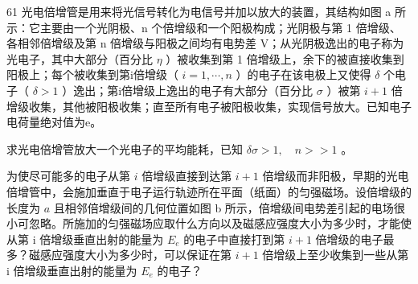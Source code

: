 \begin{problem}[33届物理竞赛复赛]{61}
    光电倍增管是用来将光信号转化为电信号并加以放大的装置，其结构如图 a 所示：它主要由一个光阴极、n 个倍增级和一个阳极构成；光阴极与第 1 倍增级、各相邻倍增级及第 n 倍增级与阳极之间均有电势差 V；从光阴极逸出的电子称为光电子，其中大部分（百分比 $\eta$ ）被收集到第 1 倍增级上，余下的被直接收集到阳极上；每个被收集到第i倍增级（ $i=1,\cdots,n$ ）的电子在该电极上又使得 $\delta$ 个电子（ $\delta>1$ ）逸出；第i倍增级上逸出的电子有大部分（百分比 $\sigma$ ）被第 $i+1$ 倍增级收集，其他被阳极收集；直至所有电子被阳极收集，实现信号放大。已知电子电荷量绝对值为e。

    \begin{subproblem}
        求光电倍增管放大一个光电子的平均能耗，已知 $\delta\sigma>1,\quad n>>1$ 。
    \end{subproblem}
    \begin{subproblem}
        为使尽可能多的电子从第 $i$ 倍增级直接到达第 $i + 1$ 倍增级而非阳极，早期的光电倍增管中，会施加垂直于电子运行轨迹所在平面（纸面）的匀强磁场。设倍增级的长度为 $a$ 且相邻倍增级间的几何位置如图 b 所示，倍增级间电势差引起的电场很小可忽略。所施加的匀强磁场应取什么方向以及磁感应强度大小为多少时，才能使从第 i 倍增级垂直出射的能量为 $E_{e}$ 的电子中直接打到第 $i+1$ 倍增级的电子最多？磁感应强度大小为多少时，可以保证在第 $i+1$ 倍增级上至少收集到一些从第 i 倍增级垂直出射的能量为 $E_{e}$ 的电子？
    \end{subproblem}
\end{problem}